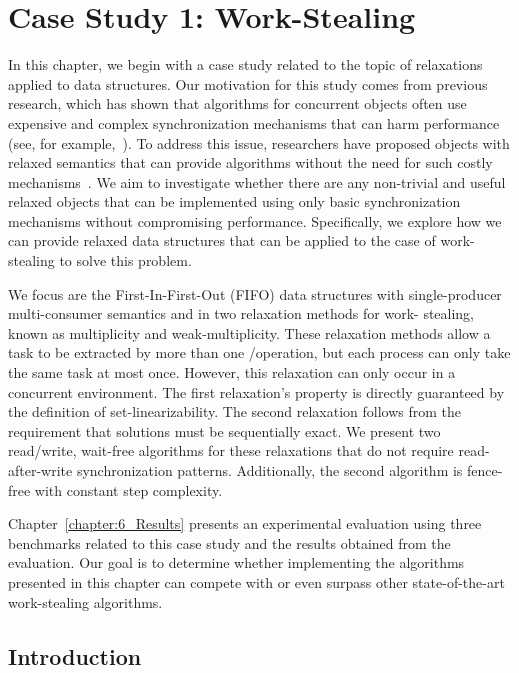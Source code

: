 \chapter{\label{chapter:4_work-stealing}Case Study 1: Work-Stealing}

In this chapter, we begin with a case study related to the topic of relaxations applied to data structures. Our motivation for this study comes from previous research, which has shown that algorithms for concurrent objects often use expensive and complex synchronization mechanisms that can harm performance (see, for example,~\cite{DBLP_conf_popl_AttiyaGHKMV11,DBLP_journals_toplas_Herlihy91}). To address this issue, researchers have proposed objects with relaxed semantics that can provide algorithms without the need for such costly mechanisms~\cite{maged.vechev.2009,fencefreework}. We aim to investigate whether there are any non-trivial and useful relaxed objects that can be implemented using only basic synchronization mechanisms without compromising performance. Specifically, we explore how we can provide relaxed data structures that can be applied to the case of work-stealing to solve this problem.

We focus are the First-In-First-Out (FIFO) data structures with single-producer multi-consumer semantics and in two relaxation methods for work- stealing, known as multiplicity and weak-multiplicity. These relaxation methods allow a task to be extracted by more than one \Take/\Steal operation, but each process can only take the same task at most once. However, this relaxation can only occur in a concurrent environment. The first relaxation's property is directly guaranteed by the definition of set-linearizability. The second relaxation follows from the requirement that solutions must be sequentially exact. We present two read/write, wait-free algorithms for these relaxations that do not require read-after-write synchronization patterns. Additionally, the second algorithm is fence-free with constant step complexity.

Chapter~\ref{chapter:6_Results} presents an experimental evaluation using three benchmarks related to this case study and the results obtained from the evaluation. Our goal is to determine whether implementing the algorithms presented in this chapter can compete with or even surpass other state-of-the-art work-stealing algorithms.

\section{Introduction}

